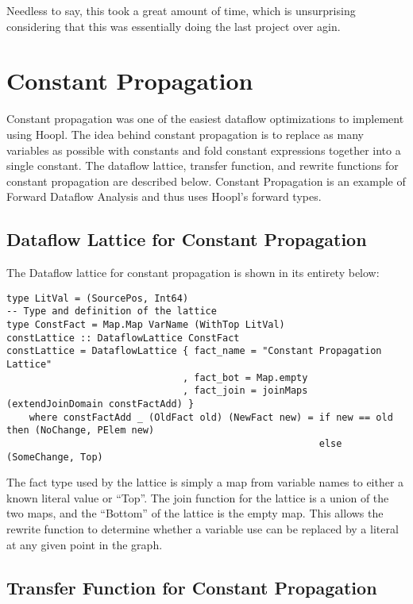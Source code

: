 \documentclass[11pt]{article}
\begin{document}
Needless to say, this took a great amount of time, which is
unsurprising considering that this was essentially doing the last
project over agin.

\section {Constant Propagation} 
\label{sec:constprop}

Constant propagation was one of the easiest dataflow optimizations to implement using Hoopl. The idea behind constant propagation is to replace as many variables as possible with constants and fold constant expressions together into a single constant. The dataflow lattice, transfer function, and rewrite functions for constant propagation are described below. Constant Propagation is an example of Forward Dataflow Analysis and thus uses Hoopl's forward types. 

\subsection { Dataflow Lattice for Constant Propagation } 

The Dataflow lattice for constant propagation is shown in its entirety below:

{\small
\begin{verbatim}
type LitVal = (SourcePos, Int64)
-- Type and definition of the lattice
type ConstFact = Map.Map VarName (WithTop LitVal)
constLattice :: DataflowLattice ConstFact
constLattice = DataflowLattice { fact_name = "Constant Propagation Lattice"
                               , fact_bot = Map.empty 
                               , fact_join = joinMaps (extendJoinDomain constFactAdd) }
    where constFactAdd _ (OldFact old) (NewFact new) = if new == old then (NoChange, PElem new)
                                                       else (SomeChange, Top)
\end{verbatim}}

The fact type used by the lattice is simply a map from variable names to either a known literal value or ``Top''. The join function for the lattice is a union of the two maps, and the ``Bottom'' of the lattice is the empty map. This allows the rewrite function to determine whether a variable use can be replaced by a literal at any given point in the graph.  

\subsection { Transfer Function for Constant Propagation }
\end{document}
